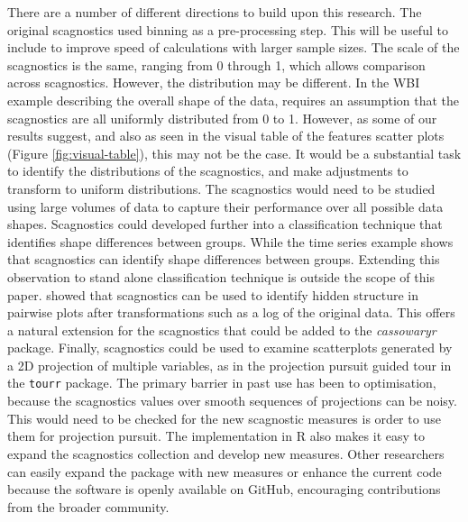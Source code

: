 There are a number of different directions to build upon this research.
The original scagnostics used binning as a pre-processing step. This
will be useful to include to improve speed of calculations with larger
sample sizes. The scale of the scagnostics is the same, ranging from 0
through 1, which allows comparison across scagnostics. However, the
distribution may be different. In the WBI example describing the overall
shape of the data, requires an assumption that the scagnostics are all
uniformly distributed from 0 to 1. However, as some of our results
suggest, and also as seen in the visual table of the features scatter
plots (Figure \ref{fig:visual-table}), this may not be the case. It
would be a substantial task to identify the distributions of the
scagnostics, and make adjustments to transform to uniform distributions.
The scagnostics would need to be studied using large volumes of data to
capture their performance over all possible data shapes. Scagnostics
could developed further into a classification technique that identifies
shape differences between groups. While the time series example shows
that scagnostics can identify shape differences between groups.
Extending this observation to stand alone classification technique is
outside the scope of this paper. \citet{hidscags} showed that
scagnostics can be used to identify hidden structure in pairwise plots
after transformations such as a log of the original data. This offers a
natural extension for the scagnostics that could be added to the
\emph{cassowaryr} package. Finally, scagnostics could be used to examine
scatterplots generated by a 2D projection of multiple variables, as in
the projection pursuit guided tour in the \texttt{tourr} package. The
primary barrier in past use has been to optimisation, because the
scagnostics values over smooth sequences of projections can be noisy.
This would need to be checked for the new scagnostic measures is order
to use them for projection pursuit. The implementation in R also makes
it easy to expand the scagnostics collection and develop new measures.
Other researchers can easily expand the package with new measures or
enhance the current code because the software is openly available on
GitHub, encouraging contributions from the broader community.



\address{%
Harriet Mason\\
Monash University\\%
Department of Econometrics and Business Statistics\\ Melbourne,
Australia\\
%
\url{https://www.britannica.com/animal/quokka}\\%
\textit{ORCiD: \href{https://orcid.org/0000-1721-1511-1101}{0000-1721-1511-1101}}\\%
\href{mailto:hmas0003@student.monash.edu}{\nolinkurl{hmas0003@student.monash.edu}}%
}

